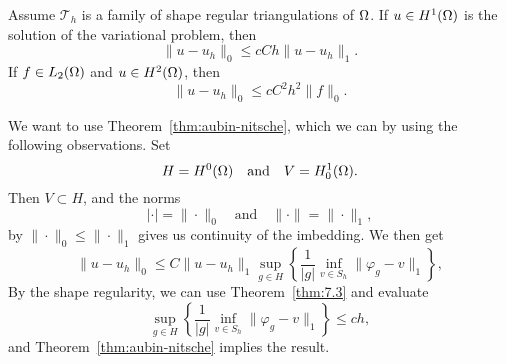 \begin{kor}{\quad}
   Assume $\mathcal{T}_h$ is a family of shape regular triangulations of $\Omega$.
   If $u\in H^1(\Omega)$ is the solution of the variational problem, then 
   \begin{equation*}
    \|u-u_h\|_0 \leq cCh \|u-u_h\|_1.
   \end{equation*}
   If $f\in L_2(\Omega)$ and $u\in H^2(\Omega)$, then 
   \begin{equation*}
    \|u-u_h\|_0 \leq cC^2h^2 \|f\|_0.
   \end{equation*}
\end{kor}
\begin{bev}
   We want to use Theorem~\ref{thm:aubin-nitsche}, which we can by 
   using the following observations. Set 
    \begin{equation*}
        H = H^0(\Omega) \quad \text{and} \quad V = H^1_0(\Omega).
    \end{equation*}
    Then $V \subset H$, and the norms 
    \begin{equation*}
        |\cdot| = \|\cdot\|_0 \quad \text{and} \quad \|\cdot\| = \|\cdot\|_1,
    \end{equation*}
    by $\|\cdot\|_0 \leq \|\cdot\|_1$ gives us continuity of the imbedding.
    We then get
    \begin{equation*}
        \|u-u_h\|_0 \leq C \|u-u_h\|_1 \sup_{g\in H} \left \{ \frac{1}{|g|} \inf_{v \in S_h} \|\varphi_g - v\|_1 \right \},
    \end{equation*}
    By the shape regularity, we can use Theorem~\ref{thm:7.3} and evaluate 
    \begin{equation*}
        \sup_{g\in H} \left \{ \frac{1}{|g|} \inf_{v \in S_h} \|\varphi_g - v\|_1 \right \}
        \leq ch,
    \end{equation*}
    and Theorem~\ref{thm:aubin-nitsche} implies the result.
\end{bev}
